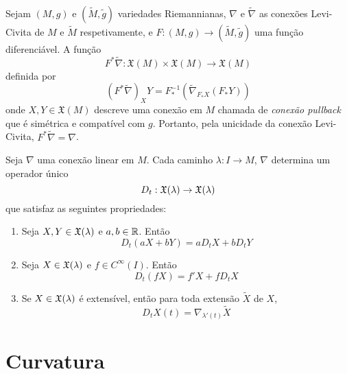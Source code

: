 \begin{observacao}
	Sejam $(M,g)$ e $(\tilde{M}, \tilde{g})$ variedades Riemannianas, $\nabla$ e $\tilde{\nabla}$ as conexões Levi-Civita de $M$ e $\tilde{M}$ respetivamente, e $F: (M,g) \rightarrow (\tilde{M},\tilde{g})$ uma função diferenciável. A função
	\begin{equation*}
		F^* \tilde{\nabla}: \mathfrak{X}(M) \times \mathfrak{X}(M) \rightarrow \mathfrak{X}(M)
	\end{equation*}
	definida por
	\begin{equation*}
		\left( F^* \tilde{\nabla} \right)_X Y = F^{-1}_* \left( \tilde{\nabla}_{F_* X} (F_* Y) \right)
	\end{equation*}
	onde $X,Y \in \mathfrak{X}(M)$ descreve uma conexão em $M$ chamada de \emph{conexão pullback} que é simétrica e compatível com $g$. Portanto, pela unicidade da conexão Levi-Civita, $F^* \tilde{\nabla} = \nabla$.
\end{observacao}

\begin{proposicao}\label{derivada-covariante-de-um-caminho}
	Seja $\nabla$ uma conexão linear em $M$. Cada caminho $\lambda: I \rightarrow M$, $\nabla$ determina um operador único
	\begin{equation*}
		D_t: \mathfrak{X}(\lambda) \rightarrow \mathfrak{X}(\lambda)
	\end{equation*}
	que satisfaz as seguintes propriedades:
	\begin{enumerate}
		\item Seja $X,Y \in \mathfrak{X}(\lambda)$ e $a,b \in \mathbb R$. Então
		\begin{equation*}
			D_t(aX + bY) = a D_t X + b D_t Y
		\end{equation*}
		\item Seja $X \in \mathfrak{X}(\lambda)$ e $f \in C^{\infty}(I)$. Então
		\begin{equation*}
			D_t(fX) = f' X + f D_t X
		\end{equation*}
		\item Se $X \in \mathfrak{X}(\lambda)$ é extensível, então para toda extensão $\tilde{X}$ de $X$,
		\begin{equation*}
			D_t X(t) = \nabla_{\lambda'(t)} \tilde{X}
		\end{equation*}
	\end{enumerate}
\end{proposicao}



\section{Curvatura}

